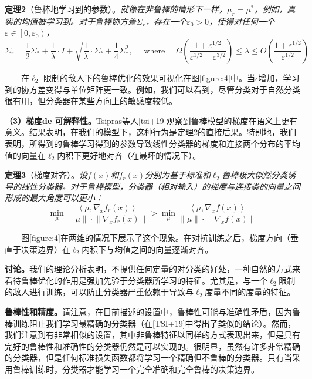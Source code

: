 \documentclass{article}
\begin{document}
\textbf{定理2}（鲁棒地学习到的参数）。\textit{就像在非鲁棒的情形下一样，$\mu_{r}=\mu^{*}$，例如，真实的均值被学习到。对于鲁棒协方差$\Sigma_{r}$，存在一个$\varepsilon_{0}>0$，使得对任何一个$\varepsilon \in\left[0, \varepsilon_{0}\right)$，}
\begin{equation*}
  \Sigma_{r}=\frac{1}{2} \Sigma_{*}+\frac{1}{\lambda} \cdot I+\sqrt{\frac{1}{\lambda} \cdot \Sigma_{*}+\frac{1}{4} \Sigma_{*}^{2}}, \quad \text { where } \quad \Omega\left(\frac{1+\varepsilon^{1 / 2}}{\varepsilon^{1 / 2}+\varepsilon^{3 / 2}}\right) \leq \lambda \leq O\left(\frac{1+\varepsilon^{1 / 2}}{\varepsilon^{1 / 2}}\right)
\end{equation*}

\ \ \ \ 在$\ell_{2}$-限制的敌人下的鲁棒优化的效果可视化在图\ref{figure:4}中。当$\epsilon$增加，学习到的协方差变得与单位矩阵更一致。例如，我们可以看到，尽管分类对于自然分类很有用，但分类器在某些方向上的敏感度较低。

\textbf{（3）梯度de 可解释性。}Tsipras等人[tsi+19]观察到鲁棒模型的梯度在语义上更有意义。结果表明，在我们的模型下，这种行为是定理2的直接后果。特别地，我们表明，所得到的鲁棒学习得到的参数导致线性分类器的梯度和连接两个分布的平均值的向量在$\ell_2$内积下更好地对齐（在最坏的情况下）。

\textbf{定理3}（梯度对齐）。\textit{设$f(x)$和$f_r(x)$分别为基于标准和$\ell_2$鲁棒极大似然分类诱导的线性分类器。对于鲁棒模型，分类器（相对输入）的梯度与连接类的向量之间形成的最大角度可以更小：}
\begin{equation*}
  \min _{\mu} \frac{\left\langle\mu, \nabla_{x} f_{r}(x)\right\rangle}{\|\mu\| \cdot\left\|\nabla_{x} f_{r}(x)\right\|}>\min _{\mu} \frac{\left\langle\mu, \nabla_{x} f(x)\right\rangle}{\|\mu\| \cdot\left\|\nabla_{x} f(x)\right\|}
\end{equation*}

\ \ \ \ 图\ref{figure:4}在两维的情况下展示了这个现象。在对抗训练之后，梯度方向（垂直于决策边界）在$\ell_2$内积下与均值之间的向量逐渐对齐。

\textbf{讨论。}我们的理论分析表明，不提供任何定量的对分类的好处，一种自然的方式来看待鲁棒优化的作用是强加先验于分类器所学习的特征。尤其是，与一个$\ell_2$限制的敌人进行训练，可以防止分类器严重依赖于导致与$\ell_2$度量不同的度量的特征。

\textbf{鲁棒性和精度。}请注意，在目前描述的设置中，鲁棒性可能与准确性矛盾，因为鲁棒训练阻止我们学习最精确的分类器（在[TSI+19]中得出了类似的结论）。然而，我们注意到有非常相似的设置，其中非鲁棒特征以同样的方式表现出来，但是具有完好的鲁棒性和准确性的分类器仍然是可以实现的。很明显，虽然有许多非常精确的分类器，但是任何标准损失函数都将学习一个精确但不鲁棒的分类器。只有当采用鲁棒训练时，分类器才能学习一个完全准确和完全鲁棒的决策边界。
\end{document}
